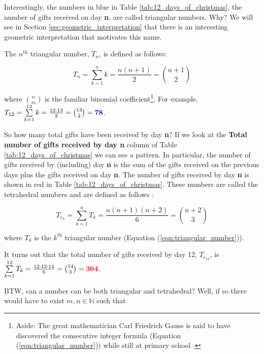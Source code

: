 \documentclass{article}
\theoremstyle{definition}
\begin{document}
\bigskip
\noindent
Interestingly, the numbers in blue in Table
\ref{tab:12_days_of_christmas}, the number of gifts received on
day {\bf n}, are called triangular numbers. Why? We will see in
Section \ref{sec:geometric_interpretation} that there is an
interesting geometric interpretation that motivates this name.

\bigskip
\noindent
The $n^{\text{th}}$ triangular number, $T_{n}$, is defined as
follows:



\begin{equation}
T_{n}= \sum _{k=1}^{n} k = \frac {n(n+1)}{2} = {n+1 \choose 2}
\label{eqn:triangular_number}
\end{equation}


\noindent
where ${\displaystyle \binom{n}{m}}$ is the familiar binomial
coefficient\footnote{Aside: The great mathematician Carl
Friedrich Gauss is said to have discovered the consecutive
integer formula (Equation (\ref{eqn:triangular_number})) while
still at primary school \cite{gauss_day_of_reckoning}.}. For example,
$T_{12} = \sum\limits_{k=1}^{12} k = \frac{12 \cdot 13}{2} = {13
\choose 2} = \mathbf{\color{blue} 78}$.

\medskip
\noindent
So how many total gifts have been received by day {\bf n}?  If we
look at the {\bf Total number of gifts received by day n} column
of Table \ref{tab:12_days_of_christmas} we can see a pattern. In
particular, the number of gifts received by (including) day {\bf
n} is the sum of the gifts received on the previous days plus the
gifts received on day {\bf n}.  The number of gifts received by
day {\bf n} is shown in red in Table
\ref{tab:12_days_of_christmas}.  These numbers are called the
tetrahedral numbers and are defined as follows \cite{A000292}:


\begin{equation}
T_{e_n} = \sum\limits_{k=1}^{n} T_k = \frac{n(n+1)(n+2)}{6} = 
          \binom{n+2}{3}
\label{eqn:tetrahedral_number}
\end{equation}

\bigskip
\noindent
where $T_{k}$ is the $k^{\text{th}}$ triangular number 
(Equation (\ref{eqn:triangular_number})).

\vspace{0.74em}
\noindent
It turns out that the total number of gifts received by day 12,
$T_{e_{12}}$, is $\sum\limits_{k=1}^{12} T_k =\frac{12 \cdot 13
\cdot 14}{6} = \binom{14}{3} = \mathbf{\color{red} {364}}$.

\noindent
BTW, can a number can be both triangular and tetrahedral? Well,
if so there would have to exist $m,n \in \mathbb{N}$ such
that
\end{document}
